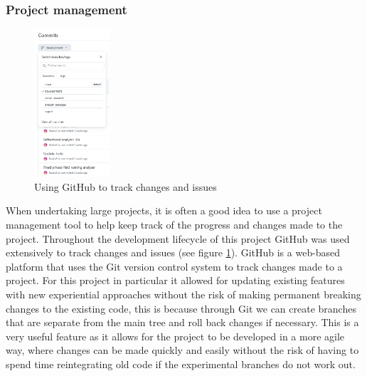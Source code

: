 \subsubsection{Project management}

\begin{figure}
    \vspace{-35px}
    \centering
    \caption{Using GitHub to track changes and issues}
    \label{fig:GitCommitHistory}
    \includegraphics[width=0.25\textwidth]{Figures/GitHubCommitHistoryCropped.png}
\end{figure}

When undertaking large projects, it is often a good idea to use a project management tool to help keep track of the progress and changes made to the project. Throughout the development lifecycle of this project GitHub was used extensively to track changes and issues (see figure \ref{fig:GitCommitHistory}). GitHub is a web-based platform that uses the Git version control system to track changes made to a project. For this project in particular it allowed for updating existing features with new experiential approaches without the risk of making permanent breaking changes to the existing code, this is because through Git we can create branches that are separate from the main tree and roll back changes if necessary. This is a very useful feature as it allows for the project to be developed in a more agile way, where changes can be made quickly and easily without the risk of having to spend time reintegrating old code if the experimental branches do not work out.
